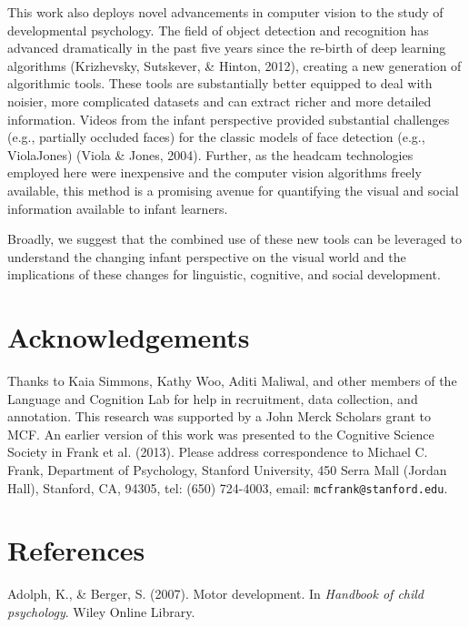 \documentclass[10pt, letterpaper]{article}
\begin{document}
This work also deploys novel advancements in computer vision to the
study of developmental psychology. The field of object detection and
recognition has advanced dramatically in the past five years since the
re-birth of deep learning algorithms (Krizhevsky, Sutskever, \& Hinton,
2012), creating a new generation of algorithmic tools. These tools are
substantially better equipped to deal with noisier, more complicated
datasets and can extract richer and more detailed information. Videos
from the infant perspective provided substantial challenges (e.g.,
partially occluded faces) for the classic models of face detection
(e.g., ViolaJones) (Viola \& Jones, 2004). Further, as the headcam
technologies employed here were inexpensive and the computer vision
algorithms freely available, this method is a promising avenue for
quantifying the visual and social information available to infant
learners.

Broadly, we suggest that the combined use of these new tools can be
leveraged to understand the changing infant perspective on the visual
world and the implications of these changes for linguistic, cognitive,
and social development.

\section{Acknowledgements}\label{acknowledgements}

Thanks to Kaia Simmons, Kathy Woo, Aditi Maliwal, and other members of
the Language and Cognition Lab for help in recruitment, data collection,
and annotation. This research was supported by a John Merck Scholars
grant to MCF. An earlier version of this work was presented to the
Cognitive Science Society in Frank et al. (2013). Please address
correspondence to Michael C. Frank, Department of Psychology, Stanford
University, 450 Serra Mall (Jordan Hall), Stanford, CA, 94305, tel:
(650) 724-4003, email: \texttt{mcfrank@stanford.edu}.

\section{References}\label{references}

\setlength{\parindent}{-0.1in} \setlength{\leftskip}{0.125in} \noindent

\hypertarget{refs}{}
\hypertarget{ref-adolph2007}{}
Adolph, K., \& Berger, S. (2007). Motor development. In \emph{Handbook
of child psychology}. Wiley Online Library.
\end{document}
